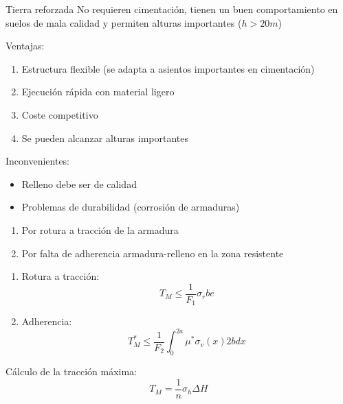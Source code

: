 \begin{mybox}{Tierra reforzada}
	No requieren cimentación, tienen un buen comportamiento en suelos de mala calidad y permiten alturas importantes ($h>20m$)
	\begin{minipage}[t]{0.5\textwidth}
	Ventajas:
	\begin{enumerate}
		\item Estructura flexible (se adapta a asientos importantes en cimentación)
		\item Ejecución rápida con material ligero
		\item Coste competitivo
		\item Se pueden alcanzar alturas importantes
	\end{enumerate}
	\end{minipage}%
	\begin{minipage}[t]{0.5\textwidth}
	Inconvenientes:
		\begin{itemize}
			\item Relleno debe ser de calidad
			\item Problemas de durabilidad (corrosión de armaduras)
		\end{itemize}
	\end{minipage}

	\begin{enumerate}
		\item Por rotura a tracción de la armadura
		\item Por falta de adherencia armadura-relleno en la zona resistente
	\end{enumerate}

	\begin{enumerate}
		\item Rotura a tracción:
		\[
			T_M \leq \frac{1}{F_1}\sigma_r b e
		\]
		\item Adherencia:
		\[
			T_M^{*}\leq \frac{1}{F_2}\int_0^{2a}\mu^* \sigma_v(x)2bdx
		\]

	\end{enumerate}
	Cálculo de la tracción máxima:
	\[
		T_M = \frac{1}{n}\sigma_h \Delta H
	\]
\end{mybox}


